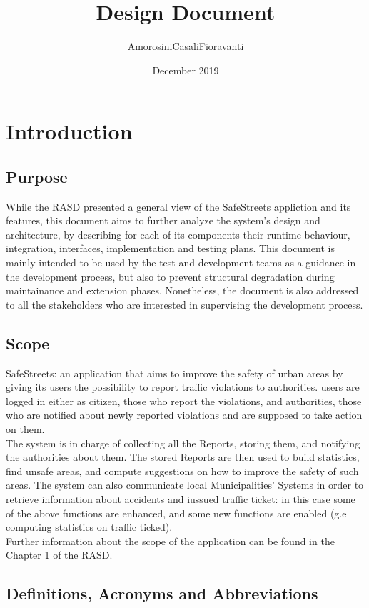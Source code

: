 \documentclass{report}
\title{Design Document}
\author{AmorosiniCasaliFioravanti}
\date{December 2019}
\begin{document}


\chapter{Introduction}
\section{Purpose}
While the RASD presented a general view of the SafeStreets appliction and its features, this document aims to further analyze the system's design and architecture, by describing for each of its components their runtime behaviour, integration, interfaces, implementation and testing plans.
This document is mainly intended to be used by the test and development teams as a guidance in the development process, but also to prevent structural degradation during maintainance and extension phases. Nonetheless, the document is also addressed to all the stakeholders who are interested in supervising the development process.

\section{Scope}
SafeStreets: an application that aims to improve the safety of urban areas by giving its users the possibility to report traffic violations to authorities. users are logged in either as citizen, those who report the violations, and authorities, those who are notified about newly reported violations and are supposed to take action on them.\\
The system is in charge of collecting all the Reports, storing them, and notifying the authorities about them. The stored Reports are then used to build statistics, find unsafe areas, and compute suggestions on how to improve the safety of such areas. The system can also communicate local Municipalities' Systems in order to retrieve information about accidents and iussued traffic ticket: in this case some of the above functions are enhanced, and some new functions are enabled (g.e computing statistics on traffic ticked).\\
\newline
Further information about the scope of the application can be found in the Chapter 1 of the RASD.

\section{Definitions, Acronyms and Abbreviations}
\end{document}
